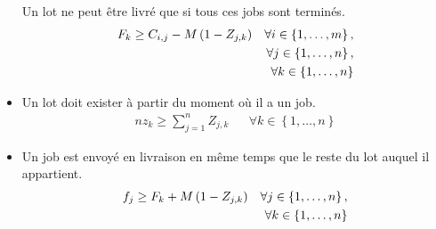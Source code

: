 \documentclass{article}
\begin{document}
\begin{itemize}
	      Un lot ne peut être livré que si tous ces jobs sont terminés.
	      \begin{align}
		      F_k \geq C_{i,j} - M\left(1-Z_{j,k}\right) &  & \forall i \in\left\{1,\dotsc, m \right\}, \notag \\
		                                                 &  & \forall j \in\left\{1,\dotsc, n \right\}, \notag \\
		                                                 &  & \forall k \in\left\{1,\dotsc, n \right\}
	      \end{align}
	\item
	      Un lot doit exister à partir du moment où il a un job.
	      \begin{align}
		      n z_k\geq\sum_{j=1}^{n}Z_{j,k} &  &
		      \forall k \in\left\{1,\dotsc,n \right\}
	      \end{align}
	\item
	      Un job est envoyé en livraison en même temps que le reste du lot auquel il appartient.
	      \begin{align}
		      f_j \geq F_k + M \left(1 - Z_{j,k} \right) &  & \forall j \in \left\{ 1,\dotsc,n \right\},\notag \\
		                                                 &  & \forall k \in \left\{ 1,\dotsc,n\right\}
	      \end{align}


\end{itemize}
\end{document}
